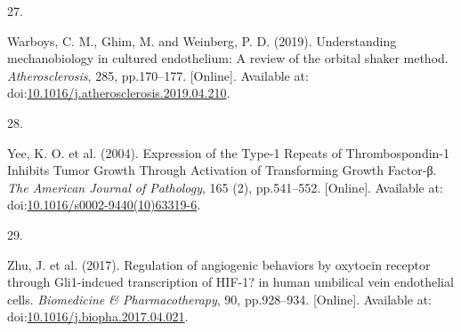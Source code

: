 \documentclass[
  11pt,
]{article}
\newlength{\cslhangindent}
\newlength{\csllabelwidth}
\newlength{\cslentryspacingunit} %
\newenvironment{CSLReferences}[2] %
 {%
  \setlength{\parindent}{0pt}
  \ifodd #1
  \let\oldpar\par
  \def\par{\hangindent=\cslhangindent\oldpar}
  \fi
  \setlength{\parskip}{#2\cslentryspacingunit}
 }%
 {}
\newcommand{\CSLLeftMargin}[1]{\parbox[t]{\csllabelwidth}{#1}}
\newcommand{\CSLRightInline}[1]{\parbox[t]{\linewidth - \csllabelwidth}{#1}\break}
\begin{document}
\begin{CSLReferences}{0}{0}
\leavevmode{}%
\CSLLeftMargin{27. }
\CSLRightInline{Warboys, C. M., Ghim, M. and Weinberg, P. D. (2019). {Understanding mechanobiology in cultured endothelium: A review of the orbital shaker method}. \emph{Atherosclerosis}, 285, pp.170--177. {[}Online{]}. Available at: doi:\href{https://doi.org/10.1016/j.atherosclerosis.2019.04.210}{10.1016/j.atherosclerosis.2019.04.210}.}

\leavevmode{}%
\CSLLeftMargin{28. }
\CSLRightInline{Yee, K. O. {et al.} (2004). {Expression of the Type-1 Repeats of Thrombospondin-1 Inhibits Tumor Growth Through Activation of Transforming Growth Factor-β}. \emph{The American Journal of Pathology}, 165 (2), pp.541--552. {[}Online{]}. Available at: doi:\href{https://doi.org/10.1016/s0002-9440(10)63319-6}{10.1016/s0002-9440(10)63319-6}.}

\leavevmode{}%
\CSLLeftMargin{29. }
\CSLRightInline{Zhu, J. {et al.} (2017). {Regulation of angiogenic behaviors by oxytocin receptor through Gli1-indcued transcription of HIF-1? in human umbilical vein endothelial cells}. \emph{Biomedicine \& Pharmacotherapy}, 90, pp.928--934. {[}Online{]}. Available at: doi:\href{https://doi.org/10.1016/j.biopha.2017.04.021}{10.1016/j.biopha.2017.04.021}.}

\end{CSLReferences}
\end{document}
